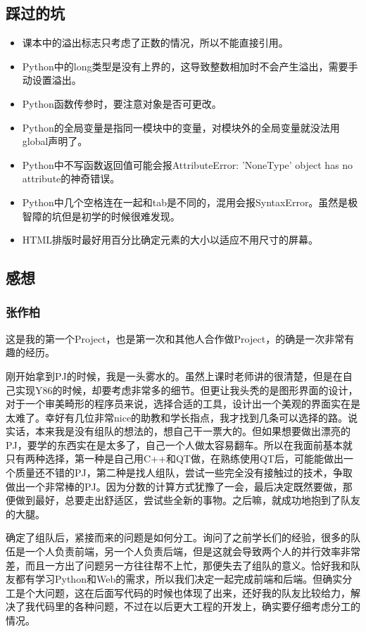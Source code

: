 \documentclass[12pt]{article} %
\begin{document}
\begin{sloppypar}
\subsection{踩过的坑}

\begin{itemize}
\item 课本中的溢出标志只考虑了正数的情况，所以不能直接引用。
\item Python中的long类型是没有上界的，这导致整数相加时不会产生溢出，需要手动设置溢出。
\item Python函数传参时，要注意对象是否可更改。
\item Python的全局变量是指同一模块中的变量，对模块外的全局变量就没法用global声明了。
\item Python中不写函数返回值可能会报AttributeError: 'NoneType' object has no attribute的神奇错误。
\item Python中几个空格连在一起和tab是不同的，混用会报SyntaxError。虽然是极智障的坑但是初学的时候很难发现。
\item HTML排版时最好用百分比确定元素的大小以适应不用尺寸的屏幕。
\end{itemize}

\subsection{感想}

\subsubsection{张作柏}
 
这是我的第一个Project，也是第一次和其他人合作做Project，的确是一次非常有趣的经历。

刚开始拿到PJ的时候，我是一头雾水的。虽然上课时老师讲的很清楚，但是在自己实现Y86的时候，却要考虑非常多的细节。但更让我头秃的是图形界面的设计，对于一个审美畸形的程序员来说，选择合适的工具，设计出一个美观的界面实在是太难了。幸好有几位非常nice的助教和学长指点，我才找到几条可以选择的路。说实话，本来我是没有组队的想法的，想自己干一票大的。但如果想要做出漂亮的PJ，要学的东西实在是太多了，自己一个人做太容易翻车。所以在我面前基本就只有两种选择，第一种是自己用C++和QT做，在熟练使用QT后，可能能做出一个质量还不错的PJ，第二种是找人组队，尝试一些完全没有接触过的技术，争取做出一个非常棒的PJ。因为分数的计算方式犹豫了一会，最后决定既然要做，那便做到最好，总要走出舒适区，尝试些全新的事物。之后嘛，就成功地抱到了队友的大腿。

确定了组队后，紧接而来的问题是如何分工。询问了之前学长们的经验，很多的队伍是一个人负责前端，另一个人负责后端，但是这就会导致两个人的并行效率非常差，而且一方出了问题另一方往往帮不上忙，那便失去了组队的意义。恰好我和队友都有学习Python和Web的需求，所以我们决定一起完成前端和后端。但确实分工是个大问题，这在后面写代码的时候也体现了出来，还好我的队友比较给力，解决了我代码里的各种问题，不过在以后更大工程的开发上，确实要仔细考虑分工的情况。


\end{sloppypar}
\end{document}
